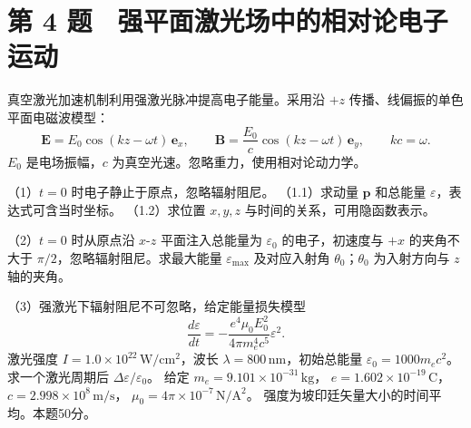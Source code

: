 \documentclass[12pt,a4paper,fontset=fandol]{ctexart}
\begin{document}
\clearpage

\section{第 4
题　强平面激光场中的相对论电子运动}\label{ux7b2c-4-ux9898-ux5f3aux5e73ux9762ux6fc0ux5149ux573aux4e2dux7684ux76f8ux5bf9ux8bbaux7535ux5b50ux8fd0ux52a8}

真空激光加速机制利用强激光脉冲提高电子能量。采用沿 \(+z\)
传播、线偏振的单色平面电磁波模型： \[
\mathbf E=E_0\cos(kz-\omega t)\,\mathbf e_x,\qquad
\mathbf B=\frac{E_0}{c}\cos(kz-\omega t)\,\mathbf e_y,
\qquad kc=\omega.
\] \(E_0\) 是电场振幅，\(c\) 为真空光速。忽略重力，使用相对论动力学。

（1）\(t=0\) 时电子静止于原点，忽略辐射阻尼。 （1.1）求动量
\(\mathbf p\) 和总能量 \(\varepsilon\)，表达式可含当时坐标。
（1.2）求位置 \(x,y,z\) 与时间的关系，可用隐函数表示。

（2）\(t=0\) 时从原点沿 \(x\)-\(z\) 平面注入总能量为 \(\varepsilon_0\)
的电子，初速度与 \(+x\) 的夹角不大于 \(\pi/2\)，忽略辐射阻尼。求最大能量
\(\varepsilon_{\max}\) 及对应入射角 \(\theta_0\)；\(\theta_0\)
为入射方向与 \(z\) 轴的夹角。

（3）强激光下辐射阻尼不可忽略，给定能量损失模型 \[
\frac{d\varepsilon}{dt}
=-\frac{e^4\mu_0E_0^2}{4\pi m_e^4c^5}\varepsilon^2.
\] 激光强度 \(I=1.0\times10^{22}\,\mathrm{W/cm^2}\)，波长
\(\lambda=800\,\mathrm{nm}\)，初始总能量
\(\varepsilon_0=1000m_ec^2\)。求一个激光周期后
\(\Delta\varepsilon/\varepsilon_0\)。 给定
\(m_e=9.101\times10^{-31}\,\mathrm{kg}\)，
\(e=1.602\times10^{-19}\,\mathrm C\)，
\(c=2.998\times10^8\,\mathrm{m/s}\)，
\(\mu_0=4\pi\times10^{-7}\,\mathrm{N/A^2}\)。
强度为坡印廷矢量大小的时间平均。本题50分。

\begin{center}
\begin{minipage}{\linewidth}
\centering\begingroup
{}
\ifdim\wd\diagrambox>.88\linewidth
\sbox{\diagrambox}{\resizebox{.88\linewidth}{!}{\usebox{\diagrambox}}}
\fi
\ifdim\ht\diagrambox>.40\textheight
\resizebox{!}{.40\textheight}{\usebox{\diagrambox}}
\else\usebox{\diagrambox}\fi
\par{}
\endgroup\end{minipage}
\end{center}
\end{document}
